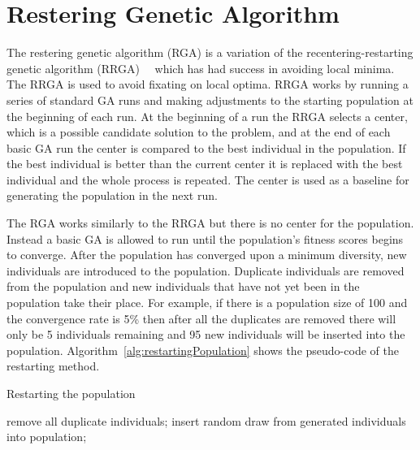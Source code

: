 \section{Restering Genetic Algorithm}

The restering genetic algorithm (RGA) is a variation of the recentering-restarting genetic algorithm (RRGA)~\cite{hughes2013recentering}~\cite{hughes2013edit} which has had success in avoiding local minima. The RRGA is used to avoid fixating on local optima. RRGA works by running a series of standard GA runs and making adjustments to the starting population at the beginning of each run. At the beginning of a run the RRGA selects a center, which is a possible candidate solution to the problem, and at the end of each basic GA run the center is compared to the best individual in the population. If the best individual is better than the current center it is replaced with the best individual and the whole process is repeated. The center is used as a baseline for generating the population in the next run.

The RGA works similarly to the RRGA but there is no center for the population. Instead a basic GA is allowed to run until the population's fitness scores begins to converge. After the population has converged upon a minimum diversity, new individuals are introduced to the population. Duplicate individuals are removed from the population and new individuals that have not yet been in the population take their place. For example, if there is a population size of 100 and the convergence rate is 5\% then after all the duplicates are removed there will only be 5 individuals remaining and 95 new individuals will be inserted into the population. Algorithm~\ref{alg:restartingPopulation} shows the pseudo-code of the restarting method.

\begin{algorithm}[H]
\caption{Restarting the population}
\label{alg:restartingPopulation}
\begin{algorithmic}

  \STATE remove all duplicate individuals;
    \STATE insert random draw from generated individuals into population;
  \ENDWHILE
\ENDIF

\end{algorithmic}
\end{algorithm}